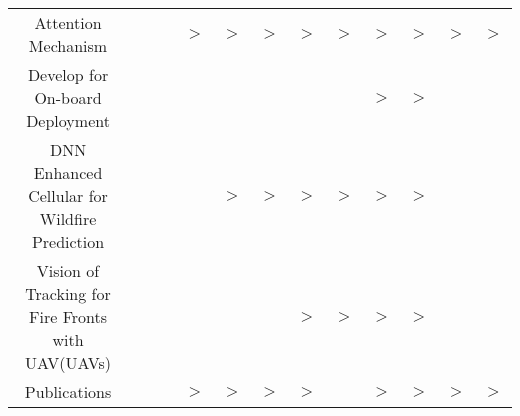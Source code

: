 \begin{table}[!ht]
{\begin{tabular}{c c c c c c c c c c c c c}
        Attention Mechanism&
        \cellcolor{mygray}& \cellcolor{mygray}& \cellcolor{mygray}&
        $>$& $>$& $>$&
        \cellcolor{mygray}$>$& \cellcolor{mygray}$>$& \cellcolor{mygray}$>$&
        $>$& $>$& $>$\\
        
        Develop for On-board Deployment&
        \cellcolor{mygray}& \cellcolor{mygray}& \cellcolor{mygray}&
        & & &
        \cellcolor{mygray}& \cellcolor{mygray}& \cellcolor{mygray}$>$&
        $>$& & \\

        DNN Enhanced Cellular for Wildfire Prediction&
        \cellcolor{mygray}& \cellcolor{mygray}& \cellcolor{mygray}&
        & $>$& $>$&
        \cellcolor{mygray}$>$& \cellcolor{mygray}$>$& \cellcolor{mygray}$>$&
        $>$& & \\
        
        Vision of Tracking for Fire Fronts with UAV(UAVs)&
        \cellcolor{mygray}& \cellcolor{mygray}& \cellcolor{mygray}&
        & & &
        \cellcolor{mygray}$>$& \cellcolor{mygray}$>$& \cellcolor{mygray}$>$&
        $>$& & \\
        
        Publications&
        \cellcolor{mygray}& \cellcolor{mygray}& \cellcolor{mygray}&
        $>$& $>$& $>$&
        \cellcolor{mygray}$>$& \cellcolor{mygray}& \cellcolor{mygray}$>$&
        $>$& $>$& $>$\\
        \bottomrule
        
        
        \end{tabular}
        }
\end{table}
